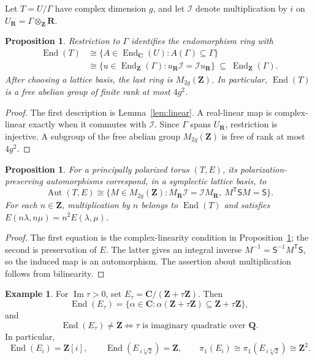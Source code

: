 \documentclass[11pt]{article}
\numberwithin{equation}{section}
\newtheorem{proposition}[theorem]{Proposition}
\theoremstyle{definition}
\newtheorem{example}[theorem]{Example}
\newcommand{\Z}{\mathbf Z}
\newcommand{\R}{\mathbf R}
\newcommand{\C}{\mathbf C}
\newcommand{\Q}{\mathbf Q}
\newcommand{\End}{\operatorname{End}}
\newcommand{\Aut}{\operatorname{Aut}}
\newcommand{\trans}{\mathsf T}
\begin{document}
Let $T=U/\Gamma$ have complex dimension $g$, and let $\mathcal I$ denote
multiplication by $i$ on $U_{\R}=\Gamma\otimes_{\Z}\R$.

\begin{proposition}\label{prop:endomorphisms}
Restriction to $\Gamma$ identifies the endomorphism ring with
\begin{align*}
 \End(T)
 &\cong\{A\in\End_{\C}(U):A(\Gamma)\subseteq\Gamma\}\\
 &\cong\{u\in\End_{\Z}(\Gamma):
       u_{\R}\mathcal I=\mathcal Iu_{\R}\}
 \ \subseteq\ \End_{\Z}(\Gamma).
\end{align*}
After choosing a lattice basis, the last ring is $M_{2g}(\Z)$.
In particular, $\End(T)$ is a free abelian group of finite rank at most
$4g^2$.
\end{proposition}

\begin{proof}
The first description is Lemma~\ref{lem:linear}. A real-linear map is
complex-linear exactly when it commutes with $\mathcal I$. Since
$\Gamma$ spans $U_{\R}$, restriction is injective. A subgroup of the
free abelian group $M_{2g}(\Z)$ is free of rank at most $4g^2$.
\end{proof}

\begin{proposition}
For a principally polarized torus $(T,E)$, its polarization-preserving
automorphisms correspond, in a symplectic lattice basis, to
\[
 \Aut(T,E)\cong
 \{M\in M_{2g}(\Z):M_{\R}\mathcal I=\mathcal I M_{\R},\
                  M^{\trans}\mathsf S M=\mathsf S\}.
\]
For each $n\in\Z$, multiplication by $n$ belongs to $\End(T)$ and
satisfies $E(n\lambda,n\mu)=n^2E(\lambda,\mu)$.
\end{proposition}

\begin{proof}
The first equation is the complex-linearity condition in
Proposition~\ref{prop:endomorphisms}; the second is preservation of $E$.
The latter gives an integral inverse
$M^{-1}=\mathsf S^{-1}M^{\trans}\mathsf S$, so the induced map is an
automorphism. The assertion about multiplication follows from
bilinearity.
\end{proof}

\begin{example}\label{ex:elliptic}
For $\operatorname{Im}\tau>0$, set $E_\tau=\C/(\Z+\tau\Z)$. Then
\[
 \End(E_\tau)=\{\alpha\in\C:
       \alpha(\Z+\tau\Z)\subseteq\Z+\tau\Z\},
\]
and
\[
 \End(E_\tau)\neq\Z
 \iff \tau\text{ is imaginary quadratic over }\Q.
\]
In particular,
\[
 \End(E_i)=\Z[i],\qquad \End(E_{\,i\sqrt[4]{2}})=\Z,
 \qquad \pi_1(E_i)\cong\pi_1(E_{\,i\sqrt[4]{2}})\cong\Z^2.
\]
\end{example}
\end{document}
